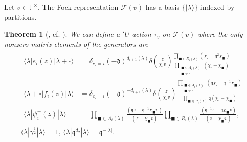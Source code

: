 \documentclass{amsart}
\newcommand{\F}{\mathbb{F}}
\newcommand{\qqq}{\mathfrak{q}}
\newcommand{\ddd}{\mathfrak{d}}
\newtheorem{thm}{Theorem}
\theoremstyle{remark}
\newtheorem{rem}[thm]{Remark}
\numberwithin{thm}{section}
\numberwithin{equation}{section}
\begin{document}
Let $v\in\F^\times$.
The Fock representation $\mathcal{F}(v)$ has a basis $\{|\lambda\rangle\}$ indexed by partitions.
\begin{thm}[\cite{FJMM}, cf. \cite{Wen}]\label{FockRep}
We can define a $'\ddot{U}$-action $\tau_v$ on $\mathcal{F}(v)$ where the only nonzero matrix elements of the generators are
\begin{gather*}
\begin{aligned}
\langle\lambda | e_i(z)|\lambda+\square\rangle&=\delta_{c_\square=i}(-\ddd)^{d_{i+1}(\lambda)}\delta\left( \frac{ z}{\chi_\square v}\right)
\frac{\displaystyle\prod_{\blacksquare\in R_{i}(\lambda)}\left( \chi_\square-\qqq^2\chi_\blacksquare \right)}
{\displaystyle\prod_{\substack{\blacksquare\in A_{i}(\lambda)\\\blacksquare\not=\square}}\left(\chi_\square-\chi_\blacksquare\right)}\\
\langle\lambda+\square |f_i(z)|\lambda\rangle&=\delta_{c_\square=i}(-\ddd)^{-d_{i+1}(\lambda)}\delta\left(\frac{ z}{\chi_\square v}\right)
\frac{\displaystyle\prod_{\substack{\blacksquare\in A_{i}(\lambda)\\\blacksquare\not=\square}}\left( \qqq\chi_\square-\qqq^{-1}\chi_\blacksquare \right)}
{\displaystyle\prod_{\blacksquare\in R_{i}(\lambda)}\qqq\left( \chi_\square-\chi_\blacksquare \right)}\\
\langle\lambda|\psi_i^\pm(z)|\lambda\rangle&=
\prod_{\blacksquare\in A_{i}(\lambda)}\frac{\left(\qqq z-\qqq^{-1}\chi_{\blacksquare}v\right)}{\left( z-\chi_\blacksquare v\right)}
\prod_{\blacksquare\in R_{i}(\lambda)}\frac{\left(\qqq^{-1} z-\qqq\chi_\blacksquare v\right)}{\left( z-\chi_\blacksquare v\right)},
\end{aligned}\\
\langle\lambda|\gamma^{\frac{1}{2}}|\lambda\rangle=1,\,\langle\lambda|\qqq^{d_2}|\lambda\rangle=\qqq^{-|\lambda|}.
\end{gather*}
\end{thm}

%
\end{document}

